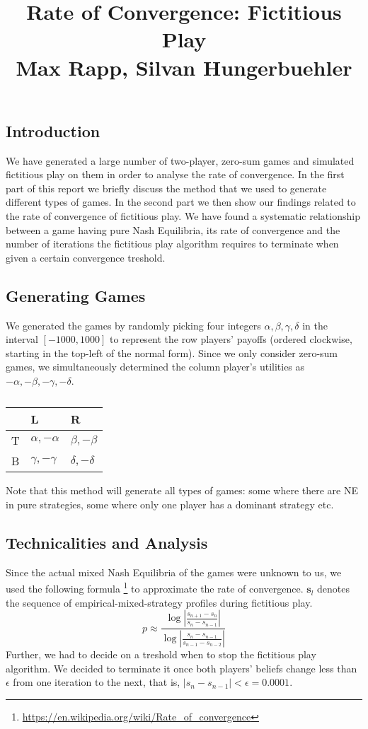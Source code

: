 \documentclass[10pt,a4paper]{article}
\title{%
  Rate of Convergence: Fictitious Play \\
  \large Max Rapp, Silvan Hungerbuehler}
\date{}
\begin{document}
\maketitle

\subsection*{Introduction}
We have generated a large number of two-player, zero-sum games and simulated fictitious play on them in order to analyse the rate of convergence. 
In the first part of this report we briefly discuss the method that we used to generate different types of games. In the second part we then show our findings related to the rate of convergence of fictitious play. We have found a systematic relationship between a game having pure Nash Equilibria, its rate of convergence and the number of iterations the fictitious play algorithm requires to terminate when given a certain convergence treshold.
\subsection*{Generating Games}
We generated the games by randomly picking four integers  $\alpha,\beta,\gamma,\delta$ in the interval $[-1000,1000]$ to represent the row players' payoffs (ordered clockwise, starting in the top-left of the normal form). Since we only consider zero-sum games, we simultaneously determined the column player's utilities as $-\alpha,-\beta,-\gamma,-\delta$.
\begin{table}[h]
\centering
\caption{}
\begin{tabular}{|l|l|l|}
\hline
  & L                & R                \\ \hline
T & $\alpha,-\alpha$ & $\beta,-\beta$   \\ \hline
B & $\gamma,-\gamma$ & $\delta,-\delta$ \\ \hline
\end{tabular}
\end{table}
Note that this method will generate all types of games: some where there are NE in pure strategies, some where only one player has a dominant strategy etc.
\subsection*{Technicalities and Analysis}
Since the actual mixed Nash Equilibria of the games were unknown to us, we used the following formula \footnote{\url{https://en.wikipedia.org/wiki/Rate_of_convergence}
} to approximate the rate of convergence. $\boldsymbol{s}_l$ denotes the sequence of empirical-mixed-strategy profiles during fictitious play.
\begin{equation*}
p\approx\frac{\log{|\frac{s_{n+1}-s_{n}}{s_{n}-s_{n-1}}|}}{\log{|\frac{s_{n}-s_{n-1}}{s_{n-1}-s_{n-2}}|}}
\end{equation*}
Further, we had to decide on a treshold when to stop the fictitious play algorithm. We decided to terminate it once both players' beliefs change less than $\epsilon$ from one iteration to the next, that is, $|s_n-s_{n-1}|<\epsilon=0.0001$. 
\end{document}
